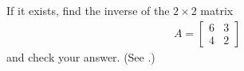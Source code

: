 If it exists, find the inverse of the $2\times 2$ matrix
%
\begin{align*}
A=\begin{bmatrix}
6&3\\4&2
\end{bmatrix}
\end{align*}
%
and check your answer.  (See .)